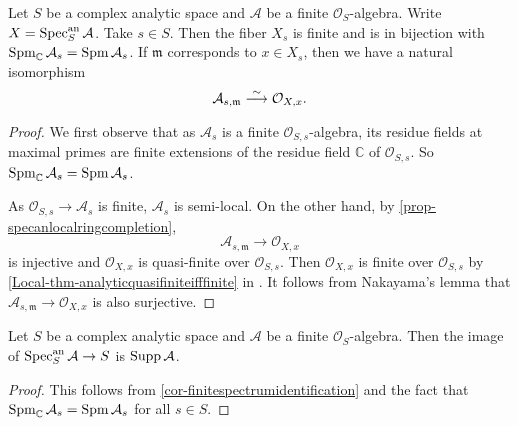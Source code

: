 \begin{corollary}\label{cor-finitespectrumidentification}
    Let $S$ be a complex analytic space and $\mathcal{A}$ be a finite $\mathcal{O}_S$-algebra. Write $X=\operatorname{Spec}^{\mathrm{an}}_S\mathcal{A}$.
    Take $s\in S$. Then the fiber $X_s$ is finite and is in bijection with $\operatorname{Spm}_{\mathbb{C}} \mathcal{A}_s=\operatorname{Spm} \mathcal{A}_s$. If $\mathfrak{m}$ corresponds to $x\in X_s$, then we have a natural isomorphism 
    \[
        \mathcal{A}_{s,\mathfrak{m}}\stackrel{\sim}{\longrightarrow} \mathcal{O}_{X,x}.  
    \]
\end{corollary}
\begin{proof}
    We first observe that as $\mathcal{A}_s$ is a finite $\mathcal{O}_{S,s}$-algebra, its residue fields at maximal primes are finite extensions of the residue field $\mathbb{C}$ of $\mathcal{O}_{S,s}$. So $\operatorname{Spm}_{\mathbb{C}} \mathcal{A}_s=\operatorname{Spm} \mathcal{A}_s$.

    As $\mathcal{O}_{S,s}\rightarrow \mathcal{A}_s$ is finite, $\mathcal{A}_s$ is semi-local. On the other hand, by \cref{prop-specanlocalringcompletion}, 
    \[
        \mathcal{A}_{s,\mathfrak{m}}\rightarrow   \mathcal{O}_{X,x}
    \]
    is injective and $\mathcal{O}_{X,x}$ is quasi-finite over $\mathcal{O}_{S,s}$. 
    Then $\mathcal{O}_{X,x}$ is finite over $\mathcal{O}_{S,s}$ by \cref{Local-thm-analyticquasifiniteifffinite} in .
    It follows from Nakayama's lemma that $\mathcal{A}_{s,\mathfrak{m}}\rightarrow   \mathcal{O}_{X,x}$ is also surjective.
\end{proof}

\begin{corollary}\label{cor-suppaffmorphism}
    Let $S$ be a complex analytic space and $\mathcal{A}$ be a finite $\mathcal{O}_S$-algebra. Then the image of $\operatorname{Spec}^{\mathrm{an}}_S\mathcal{A}\rightarrow S$ is $\operatorname{Supp} \mathcal{A}$.
\end{corollary}
\begin{proof}
    This follows from \cref{cor-finitespectrumidentification} and the fact that $\operatorname{Spm}_{\mathbb{C}}\mathcal{A}_s=\operatorname{Spm}\mathcal{A}_s$ for all $s\in S$.
\end{proof}


